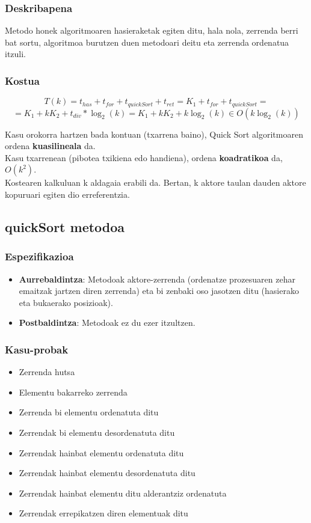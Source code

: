 \documentclass[a4paper,10pt]{report}
\begin{document}
		\subsubsection*{Deskribapena}
			Metodo honek algoritmoaren hasieraketak egiten ditu, hala nola, zerrenda berri bat sortu, algoritmoa burutzen duen metodoari deitu eta zerrenda ordenatua itzuli.
		\subsubsection*{Kostua}
			\[
				T(k) = t_{has} + t_{for} + t_{quickSort} + t_{ret} = K_{1} + t_{for} + t_{quickSort} =
			\]
			\[
				= K_{1} + kK_{2} + t_{div} * \log_{2}(k) = K_{1} + kK_{2} + k\log_{2}(k) \in O(k\log_{2}(k))
			\]
			
			Kasu orokorra hartzen bada kontuan (txarrena baino), Quick Sort algoritmoaren ordena \textbf{kuasilineala} da.\\
			Kasu txarrenean (pibotea txikiena edo handiena), ordena \textbf{koadratikoa} da, $O(k^{2})$.\\
			Kostearen kalkuluan k aldagaia erabili da. Bertan, k aktore taulan dauden aktore kopuruari egiten dio erreferentzia.
	
	\subsection{quickSort metodoa}
		\subsubsection*{Espezifikazioa}
			\begin{itemize}
				\item \textbf{Aurrebaldintza}: Metodoak aktore-zerrenda (ordenatze prozesuaren zehar emaitzak jartzen diren zerrenda) eta bi zenbaki oso jasotzen ditu (hasierako eta bukaerako posizioak).
				\item \textbf{Postbaldintza}: Metodoak ez du ezer itzultzen.
			\end{itemize}
		\subsubsection*{Kasu-probak}
		\begin{itemize}
			\item Zerrenda hutsa
			\item Elementu bakarreko zerrenda
			\item Zerrenda bi elementu ordenatuta ditu
			\item Zerrendak bi elementu desordenatuta ditu
			\item Zerrendak hainbat elementu ordenatuta ditu
			\item Zerrendak hainbat elementu desordenatuta ditu
			\item Zerrendak hainbat elementu ditu alderantziz ordenatuta
			\item Zerrendak errepikatzen diren elementuak ditu
		\end{itemize}
\end{document}
